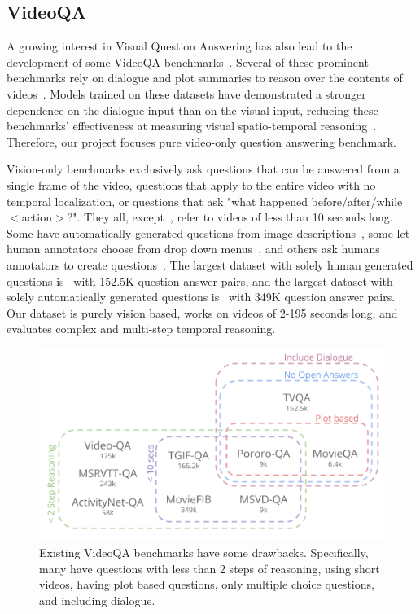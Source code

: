 \documentclass[10pt,twocolumn,letterpaper]{article}
\newcommand{\mgm}[1]{{\color{cyan}{mgm: #1}}}
\begin{document}
\subsection{VideoQA}

A growing interest in Visual Question Answering has also lead to the development of some VideoQA benchmarks~\cite{tapaswi2016movieqa,lei2018tvqa,jang2017tgif,kim2017deepstory,xu2017video,maharaj2017dataset,zeng2016leveraging,yu2019activitynet}. Several of these prominent benchmarks rely on dialogue and plot summaries to reason over the contents of videos~\cite{lei2018tvqa,tapaswi2016movieqa,kim2017deepstory}. Models trained on these datasets have demonstrated a stronger dependence on the dialogue input than on the visual input, reducing these benchmarks' effectiveness at measuring visual spatio-temporal reasoning~\cite{tapaswi2016movieqa,lei2018tvqa}. Therefore, our project focuses pure video-only question answering benchmark. 

Vision-only benchmarks exclusively ask questions that can be answered from a single frame of the video, questions that apply to the entire video with no temporal localization, or questions that ask "what happened before/after/while $<$action$>$?". They all, except~\cite{yu2019activitynet,xu2017video}, refer to videos of less than 10 seconds long.  Some have automatically generated questions from image descriptions~\cite{xu2017video,zeng2016leveraging}, some let human annotators choose from drop down menus~\cite{jang2017tgif}, and others ask humans annotators to create questions~\cite{yu2019activitynet,tapaswi2016movieqa,jang2017tgif,lei2018tvqa}. The largest dataset with solely human generated questions is~\cite{lei2018tvqa} with 152.5K question answer pairs, and the largest dataset with solely automatically generated questions is~\cite{maharaj2017dataset} with 349K question answer pairs. Our dataset is purely vision based, works on videos of 2-195 seconds long, and evaluates complex and multi-step temporal reasoning.

\begin{figure}[t]
\begin{center}
\includegraphics[width=0.8\linewidth]{Figures/figure_videoQA.png}
\end{center}
   \caption{Existing VideoQA benchmarks have some drawbacks. Specifically, many have questions with less than 2 steps of reasoning, using short videos, having plot based questions, only multiple choice questions, and including dialogue.}
\label{existing_benchmarks}
\end{figure}
\end{document}
